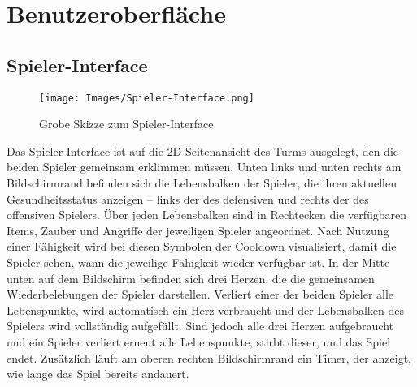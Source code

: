 \documentclass[11pt]{article}
\begin{document}
\section{Benutzeroberfläche}
\subsection{Spieler-Interface}
\begin{figure}[h]
    \centering
    \texttt{[image: Images/Spieler-Interface.png]}
    \caption{Grobe Skizze zum Spieler-Interface}
\end{figure}
\newpage
\noindent Das Spieler-Interface ist auf die 2D-Seitenansicht des Turms ausgelegt, den die beiden Spieler gemeinsam erklimmen müssen. Unten links und unten rechts am Bildschirmrand befinden sich die Lebensbalken der Spieler, die ihren aktuellen Gesundheitsstatus anzeigen – links der des defensiven und rechts der des offensiven Spielers. Über jeden Lebensbalken sind in Rechtecken die verfügbaren Items, Zauber und Angriffe der jeweiligen Spieler angeordnet. Nach Nutzung einer Fähigkeit wird bei diesen Symbolen der Cooldown visualisiert, damit die Spieler sehen, wann die jeweilige Fähigkeit wieder verfügbar ist. In der Mitte unten auf dem Bildschirm befinden sich drei Herzen, die die gemeinsamen Wiederbelebungen der Spieler darstellen. Verliert einer der beiden Spieler alle Lebenspunkte, wird automatisch ein Herz verbraucht und der Lebensbalken des Spielers wird vollständig aufgefüllt. Sind jedoch alle drei Herzen aufgebraucht und ein Spieler verliert erneut alle Lebenspunkte, stirbt dieser, und das Spiel endet. Zusätzlich läuft am oberen rechten Bildschirmrand ein Timer, der anzeigt, wie lange das Spiel bereits andauert.\\
\newpage
\end{document}
